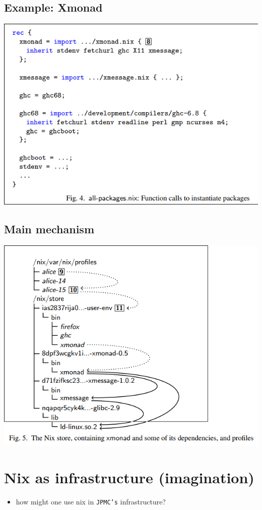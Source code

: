 \documentclass[11pt]{article}
\begin{document}
\subsection{Example: Xmonad}
\label{sec:org094a504}
\begin{center}
\includegraphics[width=.9\linewidth]{./images/screenshot-07.png}
\end{center}
\subsection{Main mechanism}
\label{sec:org67536a4}
\begin{center}
\includegraphics[width=.9\linewidth]{./images/screenshot-08.png}
\end{center}
\section{Nix as infrastructure (imagination)}
\label{sec:orgd8dbad9}
\begin{itemize}
\item how might one use nix in \texttt{JPMC's} infrastructure?
\end{itemize}
\end{document}

